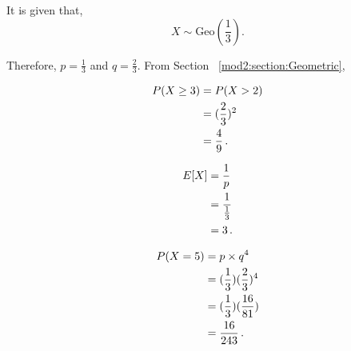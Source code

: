 \begin{subquestions}
\begin{subsubquestions}
\end{subsubquestions}


\subquestion

It is given that,
\begin{equation}
	X \sim \text{Geo}(\frac{1}{3}).
\end{equation}

Therefore, $p=\frac{1}{3}$ and $q=\frac{2}{3}$. From Section ~\ref{mod2:section:Geometric},

\begin{subsubquestions}

\subsubquestion

\begin{align}
	P(X \geq 3) & = P(X > 2) \nonumber \\
	            & = (\frac{2}{3})^2 \nonumber \\
	            & = \frac{4}{9} \,.
\end{align}


\subsubquestion

\begin{align}
	E[X] & = \frac{1}{p} \nonumber \\
	     & = \frac{1}{\frac{1}{3}} \nonumber \\
	     & = 3 \,.
\end{align}


\subsubquestion

\begin{align}
	P(X=5) & = p \times q^4 \nonumber \\
	       & = (\frac{1}{3})(\frac{2}{3})^4 \nonumber \\
	       & = (\frac{1}{3})(\frac{16}{81}) \nonumber \\
           & = \frac{16}{243} \,. 
\end{align}

\end{subsubquestions}



\end{subquestions}
